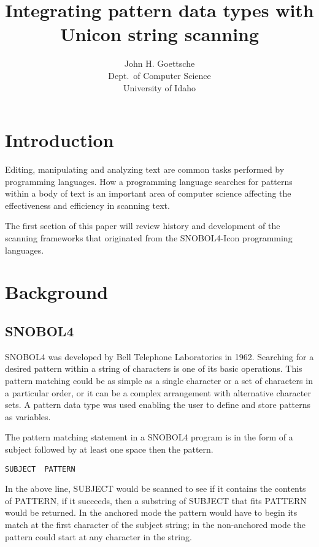 \documentclass{article}
\begin{document}
\title{Integrating pattern data types with Unicon string scanning}
\author{John H. Goettsche\\
  Dept.\ of Computer Science\\
  University of Idaho}

\maketitle

\begin{abstract}


\end{abstract}

\section{Introduction}

Editing, manipulating and analyzing text are common tasks performed by programming languages.  How a programming language searches for patterns within a body of text is an important area of computer science affecting the effectiveness and efficiency in scanning text.

The first section of this paper will review history and development of the scanning frameworks that originated from the SNOBOL4-Icon programming languages. 

\section{Background}

\subsection{SNOBOL4}
SNOBOL4 was developed by Bell Telephone Laboratories in 1962.  Searching for a desired pattern within a string of characters is one of its basic operations.  This pattern matching could be as simple as a single character or a set of characters in a particular order, or it can be a complex arrangement with alternative character sets.  A pattern data type was used enabling the user to define and store patterns as variables.~\cite{Snobol}

The pattern matching statement in a SNOBOL4 program is in the form of a subject followed by at least one space then the pattern. 

\begin{verbatim}
SUBJECT  PATTERN
\end{verbatim}
In the above line, SUBJECT would be scanned to see if it contains the contents of PATTERN, if it succeeds, then a substring of SUBJECT that fits PATTERN would be returned.  In the anchored mode the pattern would have to begin its match at the first character of the subject string; in the non-anchored mode the pattern could start at any character in the string.
\end{document}

